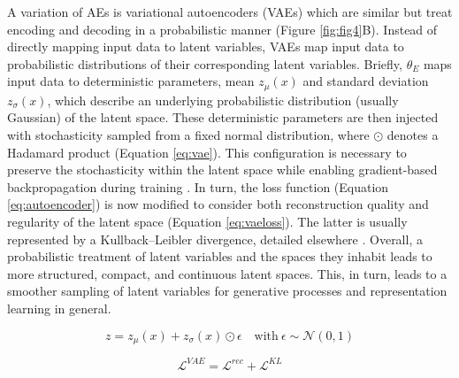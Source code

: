 	A variation of AEs is variational autoencoders (VAEs) which are similar but treat encoding and decoding in a probabilistic manner (Figure \ref{fig:fig4}B)\cite{RezendeMohamed14}. Instead of directly mapping input data to latent variables, VAEs map input data to probabilistic distributions of their corresponding latent variables. Briefly, $\theta_{E}$ maps input data to deterministic parameters, mean $z_{\mu}(x)$ and standard deviation $z_{\sigma}(x)$, which describe an underlying probabilistic distribution (usually Gaussian) of the latent space. These deterministic parameters are then injected with stochasticity sampled from a fixed normal distribution, where $\odot$ denotes a Hadamard product (Equation \ref{eq:vae}). This configuration is necessary to preserve the stochasticity within the latent space while enabling gradient-based backpropagation during training \cite{Ehrhardt2022}. In turn, the loss function (Equation \ref{eq:autoencoder}) is now modified to consider both reconstruction quality and regularity of the latent space (Equation \ref{eq:vaeloss}). The latter is usually represented by a Kullback–Leibler divergence, detailed elsewhere \cite{Ehrhardt2022}. Overall, a probabilistic treatment of latent variables and the spaces they inhabit leads to more structured, compact, and continuous latent spaces. This, in turn, leads to a smoother sampling of latent variables for generative processes and representation learning in general. 
	
	\begin{equation}
		z = z_{\mu}(x) + z_{\sigma}(x) \odot \epsilon \quad   \mathrm{with} \ \epsilon \sim \mathcal{N}(0,1)	
		\label{eq:vae}
	\end{equation}
	
	\begin{equation}
		\mathcal{L}^{VAE} = \mathcal{L}^{rec} + \mathcal{L}^{KL}
		\label{eq:vaeloss}
	\end{equation}
		
